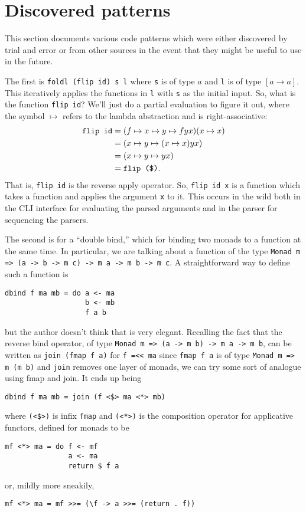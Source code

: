 \documentclass[11pt]{article}
\begin{document}
\section{Discovered patterns}
\label{sec:discovered-patterns}

This section documents various code patterns which were either
discovered by trial and error or from other sources in the event that
they might be useful to use in the future.

The first is \texttt{foldl (flip id) s l} where \texttt{s} is of type
$a$ and \texttt{l} is of type $[a\to a]$.  This iteratively applies
the functions in \texttt{l} with \texttt{s} as the initial input.  So,
what is the function \texttt{flip id}?  We'll just do a partial
evaluation to figure it out, where the symbol $\mapsto$ refers to the
lambda abstraction and is right-associative:
\begin{align*}
  \text{\texttt{flip\ id}}
  &=(f\mapsto x\mapsto y\mapsto f y x)(x\mapsto x)\\
  &=(x\mapsto y\mapsto (x\mapsto x) y x)\\
  &=(x\mapsto y\mapsto y x)\\
  &=\text{\texttt{flip\ (\$)}}.
\end{align*}
That is, \texttt{flip id} is the reverse apply operator.  So,
\texttt{flip id x} is a function which takes a function and applies
the argument \texttt{x} to it.  This occurs in the wild both in the
CLI interface for evaluating the parsed arguments and in the parser
for sequencing the parsers.

The second is for a ``double bind,'' which for binding two monads to a
function at the same time.  In particular, we are talking about a
function of the type \texttt{Monad m => (a -> b -> m c) -> m a -> m b
  -> m c}.  A straightforward way to define such a function is
\begin{verbatim}
dbind f ma mb = do a <- ma
                   b <- mb
                   f a b
\end{verbatim}
but the author doesn't think that is very elegant.  Recalling the fact
that the reverse bind operator, of type \texttt{Monad m => (a -> m b)
  -> m a -> m b}, can be written as \texttt{join (fmap f a)} for
\texttt{f =<< ma} since \texttt{fmap f a} is of type \texttt{Monad m %
  => m (m b)} and \texttt{join} removes one layer of monads, we can
try some sort of analogue using fmap and join.  It ends up being
\begin{verbatim}
dbind f ma mb = join (f <$> ma <*> mb)
\end{verbatim} %
where \texttt{(<\$>)} is infix \texttt{fmap} and \texttt{(<*>)} is the
composition operator for applicative functors, defined for monads to
be
\begin{verbatim}
mf <*> ma = do f <- mf
               a <- ma
               return $ f a
\end{verbatim} %
or, mildly more sneakily,
\begin{verbatim}
mf <*> ma = mf >>= (\f -> a >>= (return . f))
\end{verbatim} %
\end{document}
